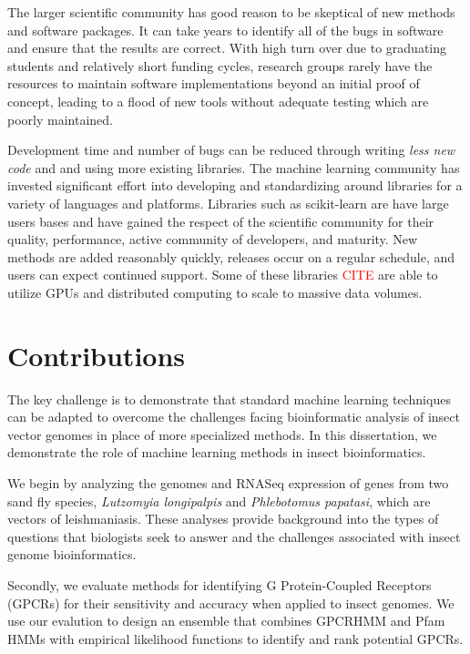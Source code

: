 The larger scientific community has good reason to be skeptical of new methods and software packages. It can take years to identify all of the bugs in software and ensure that the results are correct.  With high turn over due to graduating students and relatively short funding cycles, research groups rarely have the resources to maintain software implementations beyond an initial proof of concept, leading to a flood of new tools without adequate testing which are poorly maintained.

Development time and number of bugs can be reduced through writing \emph{less new code} and and using more existing libraries. The machine learning community has invested significant effort into developing and standardizing around libraries for a variety of languages and platforms.  Libraries such as scikit-learn \cite{scikit-learn} are have large users bases and have gained the respect of the scientific community for their quality, performance, active community of developers, and maturity. New methods are added reasonably quickly, releases occur on a regular schedule, and users can expect continued support.  Some of these libraries \textcolor{red}{CITE} are able to utilize GPUs and distributed computing to scale to massive data volumes.

\section{Contributions}
The key challenge is to demonstrate that standard machine learning techniques can be adapted to overcome the challenges facing bioinformatic analysis of insect vector genomes in place of more specialized methods.  In this dissertation, we demonstrate the role of machine learning methods in insect bioinformatics. 

We begin by analyzing the genomes and RNASeq expression of genes from two sand fly species, \emph{Lutzomyia longipalpis} and \emph{Phlebotomus papatasi}, which are vectors of leishmaniasis.  These analyses provide background into the types of questions that biologists seek to answer and the challenges associated with insect genome bioinformatics.

Secondly, we evaluate methods for identifying G Protein-Coupled Receptors (GPCRs) for their sensitivity and accuracy when applied to insect genomes.  We use our evalution to design an ensemble that combines GPCRHMM and Pfam HMMs with empirical likelihood functions to identify and rank potential GPCRs.

